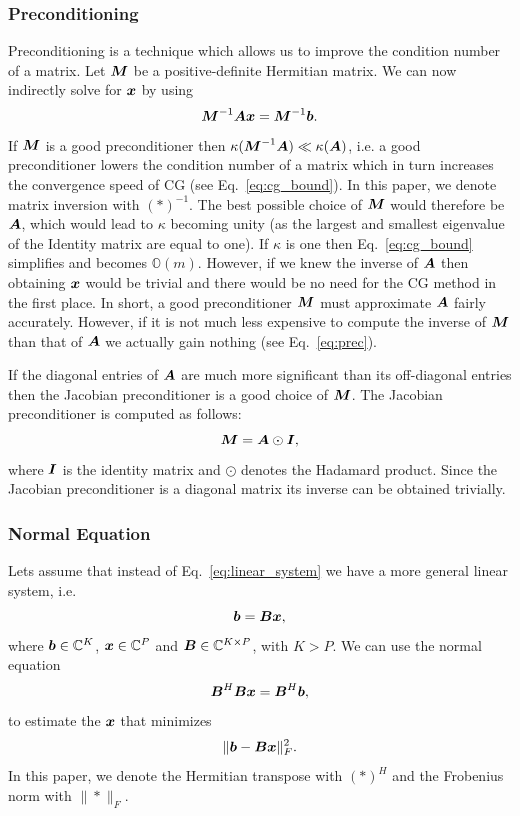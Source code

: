 \documentclass[useAMS,usenatbib]{mn2e}
\newcommand{\bA}{\bmath{A}}
\newcommand{\bB}{\bmath{B}}
\newcommand{\bM}{\bmath{M}}
\newcommand{\bI}{\bmath{I}}
\newcommand{\bb}{\bmath{b}}
\newcommand{\bx}{\bmath{x}}
\begin{document}
\subsubsection{Preconditioning}
\label{sec:precon}
Preconditioning is a technique which allows us to improve the condition number of a matrix. Let $\bM$ be a positive-definite Hermitian matrix.
We can now indirectly solve for $\bx$ by using 
\begin{equation}
\label{eq:prec}
\bM^{-1}\bA\bx = \bM^{-1}\bb.
\end{equation}
If $\bM$ is a good preconditioner then $\kappa(\bM^{-1}\bA) \ll \kappa(\bA)$, i.e. a good preconditioner lowers the condition number of a matrix which in turn increases the convergence speed 
of CG (see Eq.~\eqref{eq:cg_bound}). In this paper, we denote matrix inversion with $(*)^{-1}$. The best possible choice of $\bM$ would therefore be $\bA$, which would lead to $\kappa$ becoming unity (as the largest and smallest eigenvalue of the Identity matrix are equal to one).
If $\kappa$ is one then Eq.~\eqref{eq:cg_bound} simplifies and becomes $\mathbb{O}(m)$. However, if we knew the inverse of $\bA$ then obtaining $\bx$ would be trivial and there would be no need for the CG method in the first place. 
In short, a good preconditioner $\bM$ must approximate $\bA$ fairly accurately. However, if it is not much less expensive to 
compute the inverse of $\bM$ than that of $\bA$ we actually gain nothing (see Eq.~\eqref{eq:prec}).  

If the diagonal entries of $\bA$ are much more significant than its off-diagonal entries then the 
Jacobian preconditioner is a good choice of $\bM$. The Jacobian preconditioner is computed as follows:
\begin{equation}
\bM = \bA\odot\bI, 
\end{equation}
where $\bI$ is the identity matrix and $\odot$ denotes the Hadamard product. Since the Jacobian preconditioner is a diagonal matrix its inverse can be obtained trivially.

\subsubsection{Normal Equation}
\label{sec:normal}
Lets assume that instead of Eq.~\eqref{eq:linear_system} we have a more general linear system, i.e.
\begin{equation}
 \bb = \bB\bx,
\end{equation}
where $\bb\in\mathbb{C}^K$, $\bx\in\mathbb{C}^P$  and $\bB\in\mathbb{C}^{K \times P}$, with $K > P$. We can use the normal equation 
\begin{equation}
\label{eq:normal_equation}
\bB^H\bB\bx = \bB^H\bb, 
\end{equation}
to estimate the $\bx$ that minimizes
\begin{equation}
\label{eq:norm_ls}
\|\bb-\bB\bx\|_F^2. 
\end{equation}
In this paper, we denote the Hermitian transpose with $(*)^H$ and the Frobenius norm with $\|*\|_F$.
\end{document}
